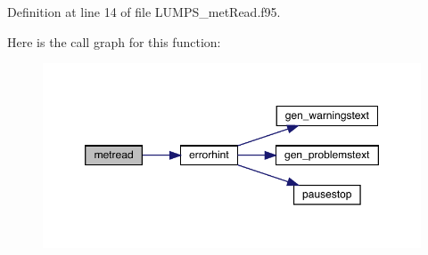 Definition at line 14 of file L\+U\+M\+P\+S\+\_\+met\+Read.\+f95.

Here is the call graph for this function\+:\nopagebreak
\begin{figure}[H]
\begin{center}
\leavevmode
\includegraphics[width=350pt]{_l_u_m_p_s__met_read_8f95_ad4740b76978a7e0fd6b2370afa3aeaa8_cgraph}
\end{center}
\end{figure}
